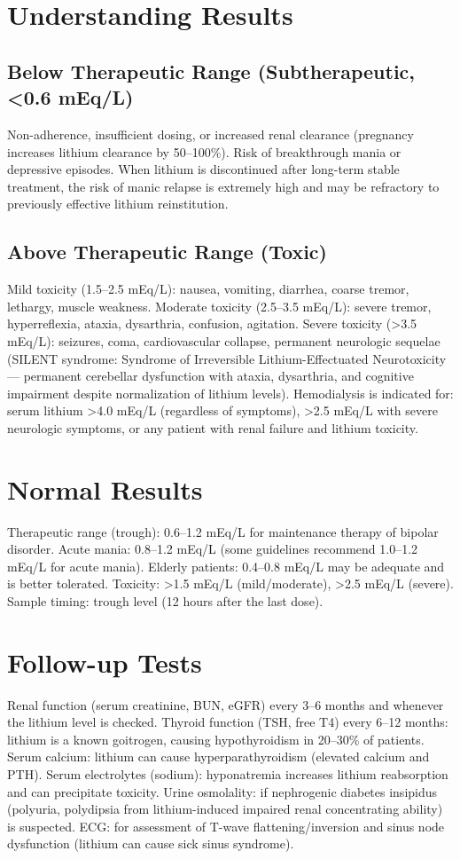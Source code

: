 \section*{Understanding Results}

\subsection*{Below Therapeutic Range (Subtherapeutic, <0.6 mEq/L)}
Non-adherence, insufficient dosing, or increased renal clearance (pregnancy increases lithium clearance by 50--100\%). Risk of breakthrough mania or depressive episodes. When lithium is discontinued after long-term stable treatment, the risk of manic relapse is extremely high and may be refractory to previously effective lithium reinstitution.

\subsection*{Above Therapeutic Range (Toxic)}
Mild toxicity (1.5--2.5 mEq/L): nausea, vomiting, diarrhea, coarse tremor, lethargy, muscle weakness. Moderate toxicity (2.5--3.5 mEq/L): severe tremor, hyperreflexia, ataxia, dysarthria, confusion, agitation. Severe toxicity (>3.5 mEq/L): seizures, coma, cardiovascular collapse, permanent neurologic sequelae (SILENT syndrome: Syndrome of Irreversible Lithium-Effectuated Neurotoxicity --- permanent cerebellar dysfunction with ataxia, dysarthria, and cognitive impairment despite normalization of lithium levels). Hemodialysis is indicated for: serum lithium >4.0 mEq/L (regardless of symptoms), >2.5 mEq/L with severe neurologic symptoms, or any patient with renal failure and lithium toxicity.

\section*{Normal Results}
Therapeutic range (trough): 0.6--1.2 mEq/L for maintenance therapy of bipolar disorder. Acute mania: 0.8--1.2 mEq/L (some guidelines recommend 1.0--1.2 mEq/L for acute mania). Elderly patients: 0.4--0.8 mEq/L may be adequate and is better tolerated. Toxicity: >1.5 mEq/L (mild/moderate), >2.5 mEq/L (severe). Sample timing: trough level (12 hours after the last dose).

\section*{Follow-up Tests}
Renal function (serum creatinine, BUN, eGFR) every 3--6 months and whenever the lithium level is checked. Thyroid function (TSH, free T4) every 6--12 months: lithium is a known goitrogen, causing hypothyroidism in 20--30\% of patients. Serum calcium: lithium can cause hyperparathyroidism (elevated calcium and PTH). Serum electrolytes (sodium): hyponatremia increases lithium reabsorption and can precipitate toxicity. Urine osmolality: if nephrogenic diabetes insipidus (polyuria, polydipsia from lithium-induced impaired renal concentrating ability) is suspected. ECG: for assessment of T-wave flattening/inversion and sinus node dysfunction (lithium can cause sick sinus syndrome).


